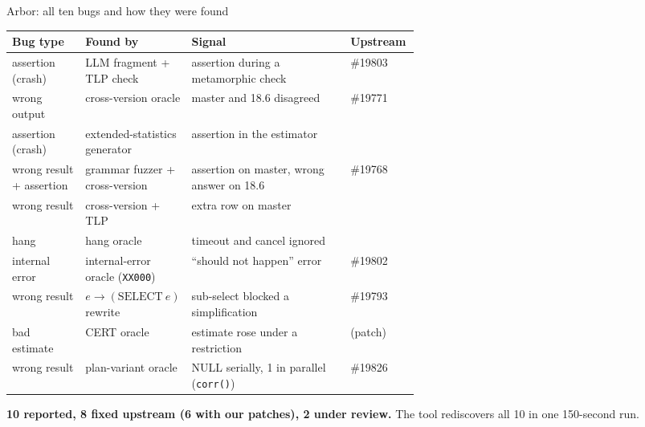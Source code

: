 \documentclass[aspectratio=169,10pt]{beamer}
\begin{document}
\begin{frame}{Arbor: all ten bugs and how they were found}
\scriptsize
\begin{tabularx}{\linewidth}{@{}L{0.18\linewidth}L{0.24\linewidth}YL{0.17\linewidth}@{}}
\toprule
Bug type & Found by & Signal & Upstream \\
\midrule
assertion (crash) & LLM fragment + TLP check & assertion during a metamorphic check &  \#19803 \\
wrong output & cross-version oracle & master and 18.6 disagreed &  \#19771 \\
assertion (crash) & extended-statistics generator & assertion in the estimator &  \\
wrong result + assertion & grammar fuzzer + cross-version & assertion on master, wrong answer on 18.6 &  \#19768 \\
wrong result & cross-version + TLP & extra row on master &  \\
hang & hang oracle & timeout and cancel ignored &  \\
internal error & internal-error oracle (\texttt{XX000}) & ``should not happen'' error &  \#19802 \\
wrong result & $e\rightarrow(\mathrm{SELECT}\ e)$ rewrite & sub-select blocked a simplification &  \#19793 \\
bad estimate & CERT oracle & estimate rose under a restriction &  (patch) \\
wrong result & plan-variant oracle & NULL serially, 1 in parallel (\texttt{corr()}) &  \#19826 \\
\bottomrule
\end{tabularx}

\smallskip
\small\textbf{10 reported, 8 fixed upstream (6 with our patches), 2 under review.} The tool rediscovers all 10 in one 150-second run.
\end{frame}
\end{document}
